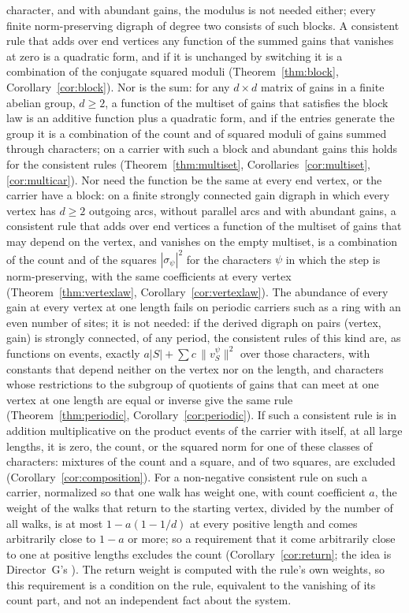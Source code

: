 character, and with abundant gains, the modulus is not needed either; every finite norm-preserving digraph of degree two consists of such blocks. A consistent rule that adds over end vertices any function of the summed gains that vanishes at zero is a quadratic form, and if it is unchanged by switching it is a combination of the conjugate squared moduli (Theorem~\ref{thm:block}, Corollary~\ref{cor:block}). Nor is the sum: for any $d\times d$ matrix of gains in a finite abelian group, $d\ge2$, a function of the multiset of gains that satisfies the block law is an additive function plus a quadratic form, and if the entries generate the group it is a combination of the count and of squared moduli of gains summed through characters; on a carrier with such a block and abundant gains this holds for the consistent rules (Theorem~\ref{thm:multiset}, Corollaries~\ref{cor:multiset}, \ref{cor:multicar}). Nor need the function be the same at every end vertex, or the carrier have a block: on a finite strongly connected gain digraph in which every vertex has $d\ge2$ outgoing arcs, without parallel arcs and with abundant gains, a consistent rule that adds over end vertices a function of the multiset of gains that may depend on the vertex, and vanishes on the empty multiset, is a combination of the count and of the squares $|\sigma_\psi|^2$ for the characters $\psi$ in which the step is norm-preserving, with the same coefficients at every vertex (Theorem~\ref{thm:vertexlaw}, Corollary~\ref{cor:vertexlaw}). The abundance of every gain at every vertex at one length fails on periodic carriers such as a ring with an even number of sites; it is not needed: if the derived digraph on pairs (vertex, gain) is strongly connected, of any period, the consistent rules of this kind are, as functions on events, exactly $a|S|+\sum c\,\lVert v^\psi_S\rVert^2$ over those characters, with constants that depend neither on the vertex nor on the length, and characters whose restrictions to the subgroup of quotients of gains that can meet at one vertex at one length are equal or inverse give the same rule (Theorem~\ref{thm:periodic}, Corollary~\ref{cor:periodic}). If such a consistent rule is in addition multiplicative on the product events of the carrier with itself, at all large lengths, it is zero, the count, or the squared norm for one of these classes of characters: mixtures of the count and a square, and of two squares, are excluded (Corollary~\ref{cor:composition}). For a non-negative consistent rule on such a carrier, normalized so that one walk has weight one, with count coefficient $a$, the weight of the walks that return to the starting vertex, divided by the number of all walks, is at most $1-a(1-1/d)$ at every positive length and comes arbitrarily close to $1-a$ or more; so a requirement that it come arbitrarily close to one at positive lengths excludes the count (Corollary~\ref{cor:return}; the idea is Director~G's \cite{dgret}). The return weight is computed with the rule's own weights, so this requirement is a condition on the rule, equivalent to the vanishing of its count part, and not an independent fact about the system.

